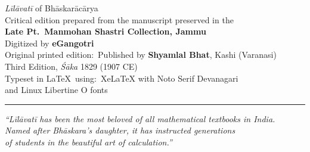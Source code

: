 \documentclass[11pt,a4paper]{book}
\newcommand{\longline}{\noindent\rule{\textwidth}{0.4pt}}
\begin{document}
\begin{center}
\begin{minipage}{0.85\textwidth}
\centering

\textit{Līlāvatī} of Bhāskarācārya\\
Critical edition prepared from the manuscript preserved in the\\
\textbf{Late Pt.\ Manmohan Shastri Collection, Jammu}\\
Digitized by \textbf{eGangotri}\\[1em]

Original printed edition:\
Published by \textbf{Shyamlal Bhat}, Kashi (Varanasi)\\
Third Edition, \textit{Śāka} 1829 (1907 CE)\\[1em]

Typeset in \LaTeX\ using:\
\textsf{XeLaTeX} with \textsf{Noto Serif Devanagari}\\
and \textsf{Linux Libertine O} fonts\\[1em]

\longline

\textit{``Līlāvatī has been the most beloved of all mathematical textbooks in India.\\
Named after Bhāskara's daughter, it has instructed generations\\
of students in the beautiful art of calculation.''}

\end{minipage}
\end{center}
\end{document}
